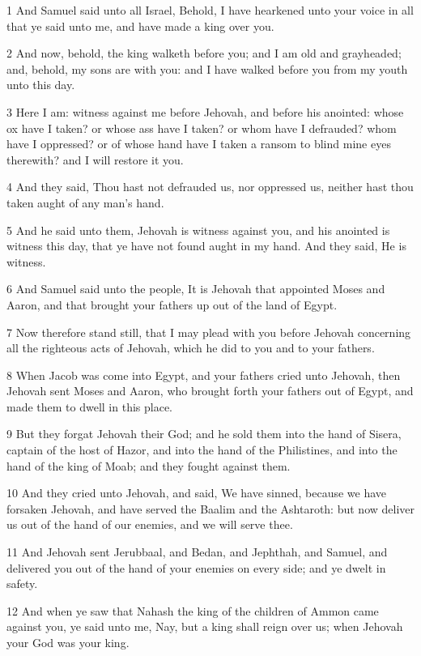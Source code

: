 \par 1 And Samuel said unto all Israel, Behold, I have hearkened unto your voice in all that ye said unto me, and have made a king over you.
\par 2 And now, behold, the king walketh before you; and I am old and grayheaded; and, behold, my sons are with you: and I have walked before you from my youth unto this day.
\par 3 Here I am: witness against me before Jehovah, and before his anointed: whose ox have I taken? or whose ass have I taken? or whom have I defrauded? whom have I oppressed? or of whose hand have I taken a ransom to blind mine eyes therewith? and I will restore it you.
\par 4 And they said, Thou hast not defrauded us, nor oppressed us, neither hast thou taken aught of any man's hand.
\par 5 And he said unto them, Jehovah is witness against you, and his anointed is witness this day, that ye have not found aught in my hand. And they said, He is witness.
\par 6 And Samuel said unto the people, It is Jehovah that appointed Moses and Aaron, and that brought your fathers up out of the land of Egypt.
\par 7 Now therefore stand still, that I may plead with you before Jehovah concerning all the righteous acts of Jehovah, which he did to you and to your fathers.
\par 8 When Jacob was come into Egypt, and your fathers cried unto Jehovah, then Jehovah sent Moses and Aaron, who brought forth your fathers out of Egypt, and made them to dwell in this place.
\par 9 But they forgat Jehovah their God; and he sold them into the hand of Sisera, captain of the host of Hazor, and into the hand of the Philistines, and into the hand of the king of Moab; and they fought against them.
\par 10 And they cried unto Jehovah, and said, We have sinned, because we have forsaken Jehovah, and have served the Baalim and the Ashtaroth: but now deliver us out of the hand of our enemies, and we will serve thee.
\par 11 And Jehovah sent Jerubbaal, and Bedan, and Jephthah, and Samuel, and delivered you out of the hand of your enemies on every side; and ye dwelt in safety.
\par 12 And when ye saw that Nahash the king of the children of Ammon came against you, ye said unto me, Nay, but a king shall reign over us; when Jehovah your God was your king.
